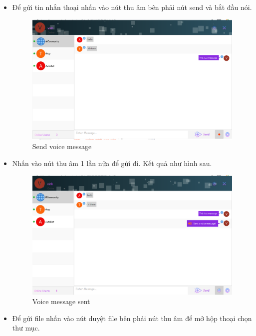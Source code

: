 \documentclass[a4paper]{article}
\begin{document}
\begin{itemize}
\begin{figure}[h!]
			\label{fig:my_label}
		\end{figure}
		\newpage
		\item Để gửi tin nhắn thoại nhấn vào nút thu âm bên phải nút send và bắt đầu nói.
		\begin{figure}[h!]
			\centering
			\includegraphics[width=13cm]{send-voice-message.PNG}
			\caption{Send voice message}
			\label{fig:my_label}
		\end{figure}
		\item Nhấn vào nút thu âm 1 lần nữa để gửi đi. Kết quả như hình sau.
		\begin{figure}[h!]
			\centering
			\includegraphics[width=13cm]{voice-message.PNG}
			\caption{Voice message sent}
			\label{fig:my_label}
		\end{figure}
		\newpage
		\item Để gửi file nhấn vào nút duyệt file bên phải nút thu âm để mở hộp thoại chọn thư mục.
		\begin{figure}[h!]
			\centering

\end{figure}
\end{itemize}
\end{document}
